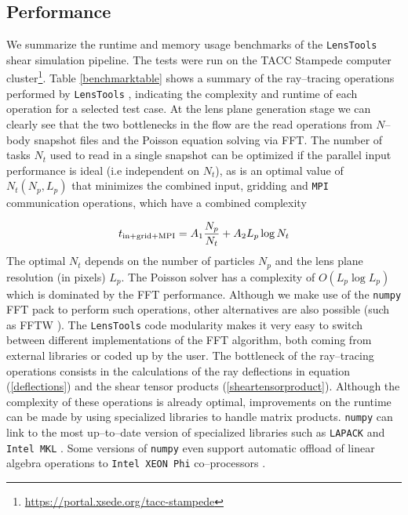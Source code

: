 \documentclass[reprint,aps,prd,superscriptaddress,showkeys,showpacs]{revtex4-1}
\newcommand{\ttt}[1]{\texttt{#1}}
\newcommand{\LT}{\texttt{LensTools} }
\begin{document}
\subsection{Performance}
%
We summarize the runtime and memory usage benchmarks of the \LT shear simulation pipeline. The tests were run on the TACC Stampede computer cluster\footnote{\url{https://portal.xsede.org/tacc-stampede}}. Table \ref{benchmarktable} shows a summary of the ray--tracing operations performed by \LT, indicating the complexity and runtime of each operation for a selected test case. At the lens plane generation stage we can clearly see that the two bottlenecks in the flow are the read operations from $N$--body snapshot files and the Poisson equation solving via FFT. The number of tasks $N_t$ used to read in a single snapshot can be optimized if the parallel input performance is ideal (i.e independent on $N_t$), as is an optimal value of $N_t(N_p,L_p)$ that minimizes the combined input, gridding and \ttt{MPI} communication operations, which have a combined complexity

\begin{equation}
t_{\rm in+grid+MPI} = A_1\frac{N_p}{N_t} + A_2L_p\log{N_t}
\end{equation} 
%
The optimal $N_t$ depends on the number of particles $N_p$ and the lens plane resolution (in pixels) $L_p$. 
The Poisson solver has a complexity of $O(L_p\log{L_p})$ which is dominated by the FFT performance. Although we make use of the \ttt{numpy} FFT pack \citep{scipy} to perform such operations, other alternatives are also possible (such as FFTW \citep{FFTW05}). The \LT code modularity makes it very easy to switch between different implementations of the FFT algorithm, both coming from external libraries or coded up by the user. 
The bottleneck of the ray--tracing operations consists in the calculations of the ray deflections in equation (\ref{deflections}) and the shear tensor products (\ref{sheartensorproduct}). Although the complexity of these operations is already optimal, improvements on the runtime can be made by using specialized libraries to handle matrix products. \ttt{numpy} can link to the most up--to--date version of specialized libraries such as \ttt{LAPACK} \citep{lapack} and \ttt{Intel MKL} \citep{intel-mkl}. Some versions of \ttt{numpy} even support automatic offload of linear algebra operations to \ttt{Intel XEON Phi} co--processors \citep{xeonphi}.     
\end{document}
